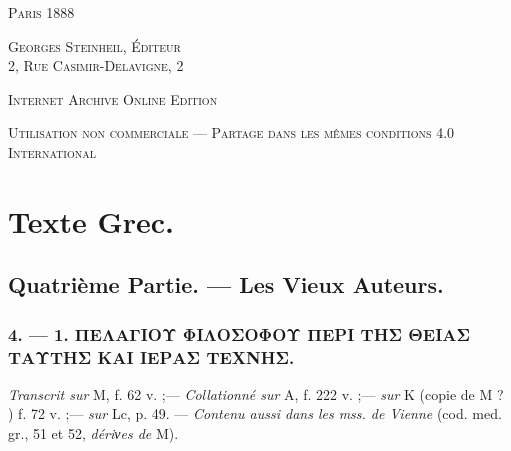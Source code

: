 \documentclass[a4paper, 11pt, oneside, polutonikogreek, french]{article}
\begin{document}
\begin{titlepage}
        \vspace*{\fill}

	\vspace{1\baselineskip}

	{\small\scshape Paris 1888}
	
	{\small\scshape{Georges Steinheil, Éditeur \\2, Rue Casimir-Delavigne, 2}}
	
	\vspace{0.5\baselineskip} %

    \scshape Internet Archive Online Edition  %
	
	{\scshape\small Utilisation non commerciale --- Partage dans les mêmes conditions 4.0 International} %
\end{titlepage}
\setlength{\parskip}{1mm plus1mm minus1mm}
\clearpage
\tableofcontents
\clearpage
\section{Texte Grec.}
\subsection{Quatrième Partie. --- Les Vieux Auteurs.}
\subsubsection{4. --- 1. ΠΕΛΑΓΙΟΥ ΦΙΛΟΣΟΦΟΥ ΠΕΡΙ ΤΗΣ ΘΕΙΑΣ ΤΑΥΤΗΣ ΚΑΙ ΙΕΡΑΣ ΤΕΧΝΗΣ.}

\emph{Transcrit sur} M, f. 62 v. ;--- \emph{Collationné sur} A, f. 222 v. ;--- \emph{sur} K (copie de M ? ) f. 72 v. ;--- \emph{sur} Lc, p. 49. --- \emph{Contenu aussi dans les mss. de Vienne} (cod. med. gr., 51 et 52, \emph{dériνes de} M).
\end{document}
